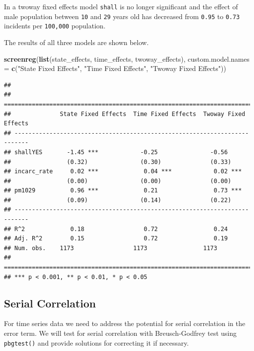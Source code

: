 \documentclass[]{article}
\newenvironment{Shaded}{\begin{snugshade}}{\end{snugshade}}
\newcommand{\KeywordTok}[1]{\textcolor[rgb]{0.13,0.29,0.53}{\textbf{{#1}}}}
\newcommand{\DataTypeTok}[1]{\textcolor[rgb]{0.13,0.29,0.53}{{#1}}}
\newcommand{\StringTok}[1]{\textcolor[rgb]{0.31,0.60,0.02}{{#1}}}
\newcommand{\NormalTok}[1]{{#1}}
\theoremstyle{definition}
\theoremstyle{definition}
\theoremstyle{remark}
\begin{document}
In a twoway fixed effects model \texttt{shall} is no longer significant
and the effect of male population between \texttt{10} and \texttt{29}
years old has decreased from \texttt{0.95} to \texttt{0.73} incidents
per \texttt{100,000} population.

The results of all three models are shown below.

\begin{Shaded}
\begin{Highlighting}[]
\KeywordTok{screenreg}\NormalTok{(}\KeywordTok{list}\NormalTok{(state_effects, time_effects, twoway_effects), }
          \DataTypeTok{custom.model.names =} \KeywordTok{c}\NormalTok{(}\StringTok{"State Fixed Effects"}\NormalTok{, }
                                 \StringTok{"Time Fixed Effects"}\NormalTok{, }
                                 \StringTok{"Twoway Fixed Effects"}\NormalTok{))}
\end{Highlighting}
\end{Shaded}

\begin{verbatim}
## 
## ==========================================================================
##              State Fixed Effects  Time Fixed Effects  Twoway Fixed Effects
## --------------------------------------------------------------------------
## shallYES       -1.45 ***            -0.25               -0.56             
##                (0.32)               (0.30)              (0.33)            
## incarc_rate     0.02 ***             0.04 ***            0.02 ***         
##                (0.00)               (0.00)              (0.00)            
## pm1029          0.96 ***             0.21                0.73 ***         
##                (0.09)               (0.14)              (0.22)            
## --------------------------------------------------------------------------
## R^2             0.18                 0.72                0.24             
## Adj. R^2        0.15                 0.72                0.19             
## Num. obs.    1173                 1173                1173                
## ==========================================================================
## *** p < 0.001, ** p < 0.01, * p < 0.05
\end{verbatim}

\subsection{Serial Correlation}\label{serial-correlation-1}

For time series data we need to address the potential for serial
correlation in the error term. We will test for serial correlation with
Breusch-Godfrey test using \texttt{pbgtest()} and provide solutions for
correcting it if necessary.
\end{document}
